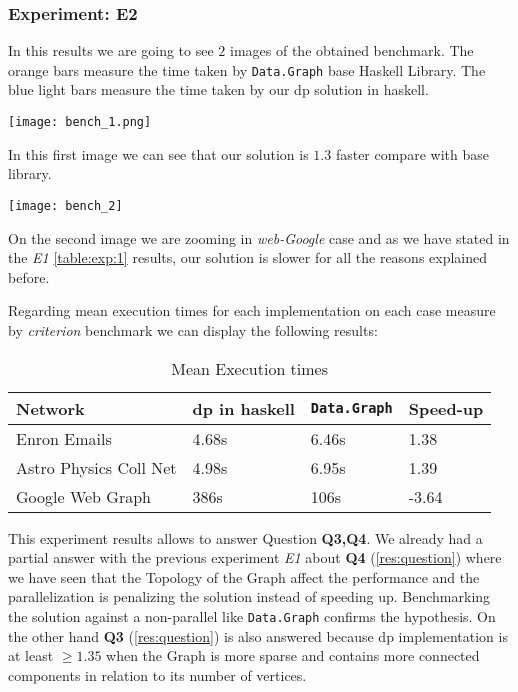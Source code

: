 \documentclass[preprint]{elsarticle}
\begin{document}
\subsubsection{\textbf{Experiment: E2}}

In this results we are going to see $2$ images of the obtained benchmark. The orange bars measure the time taken by \texttt{Data.Graph} base Haskell Library. The blue light bars measure the time taken by our \acrshort{dp} solution in \acrshort{haskell}.

\begin{minipage}[t]{\linewidth}
  \texttt{[image: bench\_1.png]}
  \captionsetup{type=figure}
  \label{fig:1}
\end{minipage}

In this first image we can see that our solution is $1.3$ faster compare with base library.

\begin{minipage}[t]{\linewidth}
  \texttt{[image: bench\_2]}
  \captionsetup{type=figure}
  \label{fig:2}
\end{minipage}

On the second image we are zooming in \emph{web-Google} case and as we have stated in the \emph{E1} \autoref{table:exp:1} results, our solution is slower for all the reasons explained before.

Regarding mean execution times for each implementation on each case measure by \emph{criterion} benchmark we can display the following results:

\begin{table}[H]
  \centering
  \begin{tabular}{|l|l|l|l|}
   \hline
   \textbf{Network} & \textbf{\acrshort{dp} in \acrshort{haskell}} & \textbf{\texttt{Data.Graph}} & \textbf{Speed-up}\\
   \hline
   Enron Emails & 4.68s &  6.46s & 1.38\\
   \hline
   Astro Physics Coll Net & 4.98s & 6.95s  & 1.39\\
   \hline
   Google Web Graph & 386s & 106s & -3.64\\
   \hline
  \end{tabular}
 \caption{Mean Execution times}
 \label{table:6}
 \end{table}

This experiment results allows to answer Question \textbf{Q3,Q4}.
We already had a partial answer with the previous experiment \emph{E1} about \textbf{Q4} (\autoref{res:question}) where we have seen that the Topology of the Graph affect the performance and the parallelization is penalizing the solution instead of speeding up. Benchmarking the solution against a non-parallel like \texttt{Data.Graph} confirms the hypothesis. On the other hand \textbf{Q3} (\autoref{res:question}) is also answered because \acrshort{dp} implementation is at least $\geq 1.35$ when the Graph is more sparse and contains more connected components in relation to its number of vertices.
\end{document}
